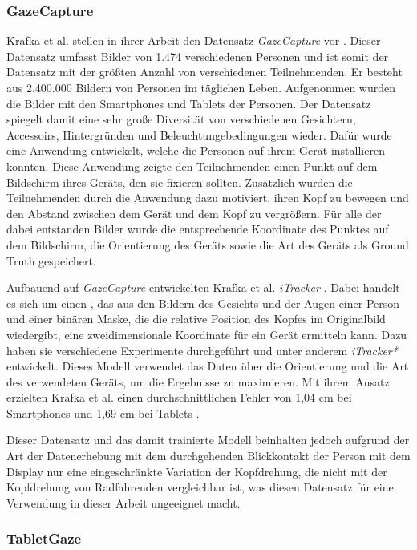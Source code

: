 \subsubsection{GazeCapture}\label{sec:related:gaze:appearance:gazecapture}

Krafka et al. stellen in ihrer Arbeit den Datensatz \textit{GazeCapture} vor \cite{paper:gazecapture}. Dieser Datensatz umfasst Bilder von 1.474 verschiedenen Personen und ist somit der Datensatz mit der größten Anzahl von verschiedenen Teilnehmenden. Er besteht aus 2.400.000 Bildern von Personen im täglichen Leben. Aufgenommen wurden die Bilder mit den Smartphones und Tablets der Personen. Der Datensatz spiegelt damit eine sehr große Diversität von verschiedenen Gesichtern, Accessoirs, Hintergründen und Beleuchtungebedingungen wieder. Dafür wurde eine Anwendung entwickelt, welche die Personen auf ihrem Gerät installieren konnten. Diese Anwendung zeigte den Teilnehmenden einen Punkt auf dem Bildschirm ihres Geräts, den sie fixieren sollten. Zusätzlich wurden die Teilnehmenden durch die Anwendung dazu motiviert, ihren Kopf zu bewegen und den Abstand zwischen dem Gerät und dem Kopf zu vergrößern. Für alle der dabei entstanden Bilder wurde die entsprechende Koordinate des Punktes auf dem Bildschirm, die Orientierung des Geräts sowie die Art des Geräts als Ground Truth gespeichert.

Aufbauend auf \textit{GazeCapture} entwickelten Krafka et al. \textit{iTracker} \cite{paper:gazecapture}. Dabei handelt es sich um einen \cnn, das aus den Bildern des Gesichts und der Augen einer Person und einer binären Maske, die die relative Position des Kopfes im Originalbild wiedergibt, eine zweidimensionale Koordinate für ein Gerät ermitteln kann. Dazu haben sie verschiedene Experimente durchgeführt und unter anderem \textit{iTracker*} entwickelt. Dieses Modell verwendet das Daten über die Orientierung und die Art des verwendeten Geräts, um die Ergebnisse zu maximieren. Mit ihrem Ansatz erzielten Krafka et al. einen durchschnittlichen Fehler von 1,04 cm bei Smartphones und 1,69 cm bei Tablets \cite{paper:gazecapture}.

Dieser Datensatz und das damit trainierte Modell beinhalten jedoch aufgrund der Art der Datenerhebung mit dem durchgehenden Blickkontakt der Person mit dem Display nur eine eingeschränkte Variation der Kopfdrehung, die nicht mit der Kopfdrehung von Radfahrenden vergleichbar ist, was diesen Datensatz für eine Verwendung in dieser Arbeit ungeeignet macht.

\subsubsection{TabletGaze}\label{sec:related:gaze:appearance:tabletgaze}

